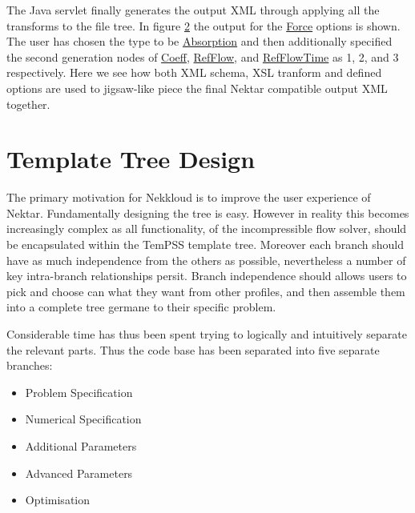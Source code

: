 \documentclass[11pt, a4paper]{report}
\begin{document}
\begin{figure}[htb!]
 \centering
 
 \label{fig:xsl_final}
\end{figure}

\begin{figure}[htb!]
 \centering
 
 \label{fig:xml_output}
\end{figure}

The Java servlet finally generates the output XML through applying all the transforms to the file tree. In figure \ref{fig:xml_output} the output for the \url{Force} options is shown. The user has chosen the type to be \url{Absorption} and then additionally specified the second generation nodes of \url{Coeff}, \url{RefFlow}, and \url{RefFlowTime} as 1, 2, and 3 respectively. Here we see how both XML schema, XSL tranform and defined options are used to jigsaw-like piece the final Nektar compatible output XML together.

\section{Template Tree Design}
The primary motivation for Nekkloud is to improve the user experience of Nektar. Fundamentally designing the tree is easy. However in reality this becomes increasingly complex as all functionality, of the incompressible flow solver, should be encapsulated within the TemPSS template tree. Moreover each branch should have as much independence from the others as possible, nevertheless a number of key intra-branch relationships persit. Branch independence should allows users to pick and choose can what they want from other profiles, and then assemble them into a complete tree germane to their specific problem.

Considerable time has thus been spent trying to logically and intuitively separate the relevant parts. Thus the code base has been separated into five separate branches:

\begin{itemize}
\item Problem Specification
\item Numerical Specification
\item Additional Parameters
\item Advanced Parameters
\item Optimisation
\end{itemize}
\end{document}
